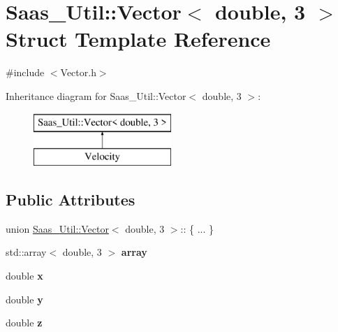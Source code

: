 \hypertarget{struct_saas___util_1_1_vector_3_01double_00_013_01_4}{}\section{Saas\+\_\+\+Util\+:\+:Vector$<$ double, 3 $>$ Struct Template Reference}
\label{struct_saas___util_1_1_vector_3_01double_00_013_01_4}


{\ttfamily \#include $<$Vector.\+h$>$}

Inheritance diagram for Saas\+\_\+\+Util\+:\+:Vector$<$ double, 3 $>$\+:\begin{figure}[H]
\begin{center}
\leavevmode
\includegraphics[height=2.000000cm]{struct_saas___util_1_1_vector_3_01double_00_013_01_4}
\end{center}
\end{figure}
\subsection*{Public Attributes}
\begin{DoxyCompactItemize}
\item 
\hypertarget{struct_saas___util_1_1_vector_3_01double_00_013_01_4_a37928c99b1581f94837e59eef3138afa}{}union \hyperlink{class_saas___util_1_1_vector}{Saas\+\_\+\+Util\+::\+Vector}$<$ double, 3 $>$\+:: \{ ... \}  \label{struct_saas___util_1_1_vector_3_01double_00_013_01_4_a37928c99b1581f94837e59eef3138afa}

\item 
\hypertarget{struct_saas___util_1_1_vector_3_01double_00_013_01_4_a87e1bd005680d453dd3c20b0a279f5af}{}std\+::array$<$ double, 3 $>$ {\bfseries array}\label{struct_saas___util_1_1_vector_3_01double_00_013_01_4_a87e1bd005680d453dd3c20b0a279f5af}

\item 
\hypertarget{struct_saas___util_1_1_vector_3_01double_00_013_01_4_ac29007aa4e007a21d4c3ff6f8e64791f}{}double {\bfseries x}\label{struct_saas___util_1_1_vector_3_01double_00_013_01_4_ac29007aa4e007a21d4c3ff6f8e64791f}

\item 
\hypertarget{struct_saas___util_1_1_vector_3_01double_00_013_01_4_a152c36b85a4581da2e886eee89371916}{}double {\bfseries y}\label{struct_saas___util_1_1_vector_3_01double_00_013_01_4_a152c36b85a4581da2e886eee89371916}

\item 
\hypertarget{struct_saas___util_1_1_vector_3_01double_00_013_01_4_a13250002f9258c672b04cb248927aae2}{}double {\bfseries z}\label{struct_saas___util_1_1_vector_3_01double_00_013_01_4_a13250002f9258c672b04cb248927aae2}

\end{DoxyCompactItemize}


